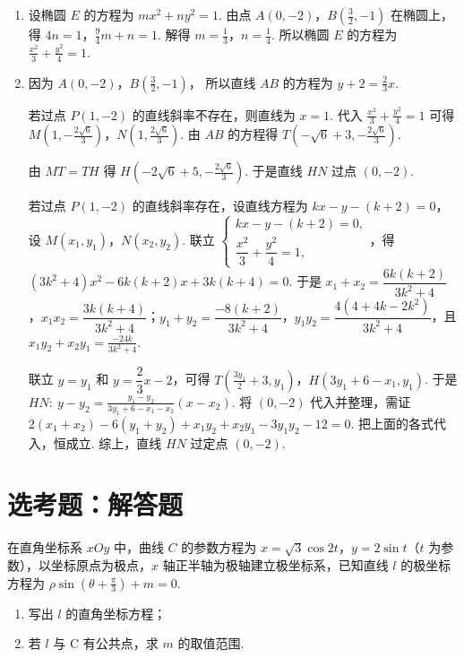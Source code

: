 \begin{solution}
\begin{enumerate}
\item 设椭圆 \(E\) 的方程为
\(mx^2+ny^2=1\).
由点 \(A(0,-2)\)，\(B\left(\frac32,-1\right)\) 在椭圆上，得
\(4n=1\)，\(\frac94m+n=1\).
解得
\(m=\frac13\)，\(n=\frac14\).
所以椭圆 \(E\) 的方程为
\(\frac{x^2}{3}+\frac{y^2}{4}=1\).

\item 因为
\(A(0,-2)\)，\(B\left(\frac32,-1\right)\)，
所以直线 \(AB\) 的方程为
\(y+2=\frac23x\).

若过点 \(P(1,-2)\) 的直线斜率不存在，则直线为
\(x=1\).
代入
\(\frac{x^2}{3}+\frac{y^2}{4}=1\)
可得
\(M\left(1,-\frac{2\sqrt6}{3}\right)\)，\(N\left(1,\frac{2\sqrt6}{3}\right)\).
由 \(AB\) 的方程得
\(T\left(-\sqrt6+3,-\frac{2\sqrt6}{3}\right)\).

由 \(MT=TH\) 得
\(H\left(-2\sqrt6+5,-\frac{2\sqrt6}{3}\right)\).
于是直线 \(HN\) 过点 \((0,-2)\).

若过点 \(P(1,-2)\) 的直线斜率存在，设直线方程为 \(kx-y-(k+2)=0\)，设 \(M(x_1,y_1)\)，\(N(x_2,y_2)\). 联立 \(\begin{cases}
kx-y-(k+2)=0,\\
\dfrac{x^2}{3}+\dfrac{y^2}{4}=1,
\end{cases}\)，得 \((3k^2+4)x^2-6k(k+2)x+3k(k+4)=0\). 于是 \(x_1+x_2=\dfrac{6k(k+2)}{3k^2+4}\)，\(x_1x_2=\dfrac{3k(k+4)}{3k^2+4}\)；\(y_1+y_2=\dfrac{-8(k+2)}{3k^2+4}\)，\(y_1y_2=\dfrac{4(4+4k-2k^2)}{3k^2+4}\)，且 \(x_1y_2+x_2y_1=\frac{-24k}{3k^2+4}\).

联立 \(y=y_1\) 和 \(y=\dfrac23x-2\)，可得
\(T\left(\frac{3y_1}{2}+3,y_1\right)\)，\(H(3y_1+6-x_1,y_1)\).
于是 \(HN:\ y-y_2=\frac{y_1-y_2}{3y_1+6-x_1-x_2}(x-x_2)\). 将 \((0,-2)\) 代入并整理，需证 \(2(x_1+x_2)-6(y_1+y_2)+x_1y_2+x_2y_1-3y_1y_2-12=0\).
把上面的各式代入，恒成立.
综上，直线 \(HN\) 过定点
\((0,-2)\).
\end{enumerate}
\end{solution}

\section{选考题：解答题}

\begin{problem}
在直角坐标系 \(xOy\) 中，曲线 \(C\) 的参数方程为 \(x=\sqrt3\cos2t\)，\(y=2\sin t\)（\(t\) 为参数），以坐标原点为极点，\(x\) 轴正半轴为极轴建立极坐标系，已知直线 \(l\) 的极坐标方程为 \(\rho\sin\left(\theta+\frac{\pi}{3}\right)+m=0\).

\begin{enumerate}
\item 写出 \(l\) 的直角坐标方程；
\item 若 \(l\) 与 C 有公共点，求 \(m\) 的取值范围.
\end{enumerate}
\end{problem}

